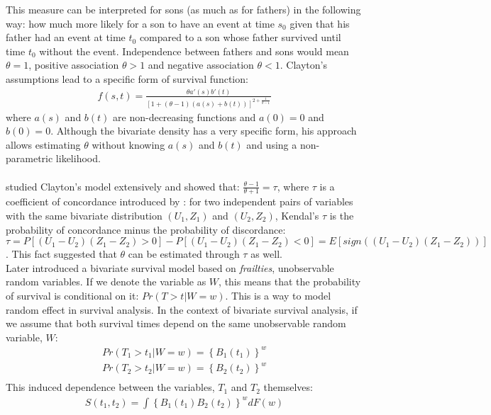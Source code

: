 \documentclass[]{article}
\begin{document}
This measure can be interpreted for sons (as much as for fathers) in the following way: how much more likely for a son to have an event at time $s_0$ given that his father had an event at time $t_0$ compared to a son whose father survived until time $t_0$ without the event. Independence between fathers and sons would mean $\theta = 1$, positive association $\theta > 1$ and negative association $\theta < 1$.
Clayton's assumptions lead to a specific form of survival function:
$$
\begin{aligned}
f(s,t) = \frac{\theta a'(s)b'(t)}{[1+(\theta - 1)(a(s) + b(t))]^{2+\frac{1}{\theta-1}}}
\end{aligned}
$$
where $a(s)$ and $b(t)$ are non-decreasing functions and $a(0)=0$ and $b(0)=0$. Although the bivariate density has a very specific form, his approach allows estimating $\theta$ without knowing $a(s)$ and $b(t)$ and using a non-parametric likelihood.\\
~\\
\cite{oakes1982model} studied Clayton's model extensively and showed that: $\frac{\theta - 1}{\theta + 1} = \tau$, where $\tau$ is a coefficient of concordance introduced by  \cite{kendall1938new}: for two independent pairs of variables with the same bivariate distribution $(U_1, Z_1)$ and $(U_2, Z_2)$, Kendal's $\tau$ is the probability of concordance minus the probability of discordance:
$\tau = P[(U_1 - U_2)(Z_1 - Z_2)>0] - P[(U_1 - U_2)(Z_1 - Z_2)<0] = E[sign((U_1 - U_2)(Z_1 - Z_2))]$. This fact suggested that $\theta$ can be estimated through $\tau$ as well.\\

Later \cite{oakes1989bivariate} introduced a bivariate survival model based on \emph{frailties}, unobservable random variables. If we denote the variable as $W$, this means that the probability of survival is conditional on it: $Pr(T>t|W=w)$. This is a way to model random effect in survival analysis. In the context of bivariate survival analysis, if we assume that both survival times depend on the same unobservable random variable, $W$:
$$
\begin{aligned}
	Pr(T_1>t_1|W=w)=\left\{ B_1(t_1) \right\}^w\\
	Pr(T_2>t_2|W=w)=\left\{ B_2(t_2) \right\}^w\\
\end{aligned}
$$
This induced dependence between the variables, $T_1$ and $T_2$ themselves:
$$
\begin{aligned}
	S(t_1,t_2) = \int \left\{ B_1(t_1) B_2(t_2)\right\}^w dF(w)
\end{aligned}
$$
\end{document}

